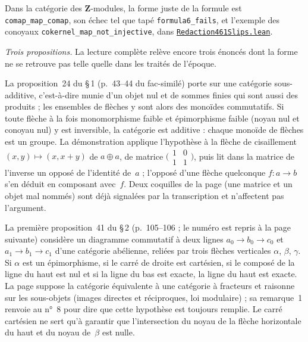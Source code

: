 \begin{sloppypar}
\noindent Dans la catégorie des $\mathbf Z$-modules, la forme juste de la formule est \texttt{comap\_map\_comap}, son échec tel que tapé \texttt{formula6\_fails}, et l'exemple des conoyaux \texttt{cokernel\_map\_not\_injective}, dans \href{\leanblobmain/Redaction461Slips.lean}{\texttt{Redaction461\allowbreak{}Slips.\allowbreak{}lean}}.
\end{sloppypar}

\emph{Trois propositions.} La lecture complète relève encore trois énoncés dont la forme ne se
retrouve pas telle quelle dans les traités de l'époque.

La proposition~24 du \S\,1 (p.~43--44 du fac-similé) porte sur une catégorie sous-additive,
c'est-à-dire munie d'un objet nul et de sommes finies qui sont aussi des produits ; les
ensembles de flèches y sont alors des monoïdes commutatifs. Si toute flèche à la fois
monomorphisme faible et épimorphisme faible (noyau nul et conoyau nul) y est inversible, la
catégorie est additive : chaque monoïde de flèches est un groupe. La démonstration applique
l'hypothèse à la flèche de cisaillement $(x, y) \mapsto (x, x + y)$ de $a \oplus a$, de matrice
$\bigl(\begin{smallmatrix} 1 & 0 \\ 1 & 1 \end{smallmatrix}\bigr)$, puis lit dans la matrice de
l'inverse un opposé de l'identité de~$a$ ; l'opposé d'une flèche quelconque $f : a \to b$ s'en
déduit en composant avec~$f$. Deux coquilles de la page (une matrice et un objet mal nommés)
sont déjà signalées par la transcription et n'affectent pas l'argument.

La première proposition~41 du \S\,2 (p.~105--106 ; le numéro est repris à la page suivante)
considère un diagramme commutatif à deux lignes $a_0 \to b_0 \to c_0$ et $a_1 \to b_1 \to c_1$
d'une catégorie abélienne, reliées par trois flèches verticales $\alpha$, $\beta$, $\gamma$. Si
$\alpha$ est un épimorphisme, si le carré de droite est cartésien, si le composé de la ligne du
haut est nul et si la ligne du bas est exacte, la ligne du haut est exacte. La page suppose la
catégorie équivalente à une catégorie à fracteurs et raisonne sur les sous-objets (images
directes et réciproques, loi modulaire) ; sa remarque~1 renvoie au n°~8 pour dire que cette
hypothèse est toujours remplie. Le carré cartésien ne sert qu'à garantir que l'intersection du
noyau de la flèche horizontale du haut et du noyau de~$\beta$ est nulle.

